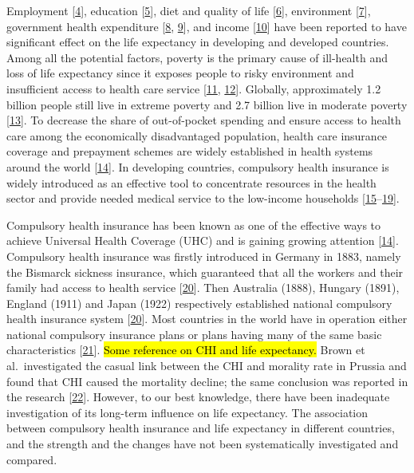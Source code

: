 \documentclass[]{elsarticle} %
\begin{document}
Employment {[}\protect\hyperlink{ref-assari2018life}{4}{]}, education {[}\protect\hyperlink{ref-baker2011education}{5}{]}, diet and quality of life {[}\protect\hyperlink{ref-rehm2018drinking}{6}{]}, environment {[}\protect\hyperlink{ref-schwartz2018estimating}{7}{]}, government health expenditure {[}\protect\hyperlink{ref-jakovljevic2016life}{8}, \protect\hyperlink{ref-ranabhat2018influence}{9}{]}, and income {[}\protect\hyperlink{ref-wilkinson2018impact}{10}{]} have been reported to have significant effect on the life expectancy in developing and developed countries.
Among all the potential factors, poverty is the primary cause of ill-health and loss of life expectancy since it exposes people to risky environment and insufficient access to health care service {[}\protect\hyperlink{ref-world2001dying}{11}, \protect\hyperlink{ref-ezeh2017history}{12}{]}.
Globally, approximately 1.2 billion people still live in extreme poverty and 2.7 billion live in moderate poverty {[}\protect\hyperlink{ref-olinto2013state}{13}{]}.
To decrease the share of out-of-pocket spending and ensure access to health care among the economically disadvantaged population, health care insurance coverage and prepayment schemes are widely established in health systems around the world {[}\protect\hyperlink{ref-wagstaff2018progress}{14}{]}.
In developing countries, compulsory health insurance is widely introduced as an effective tool to concentrate resources in the health sector and provide needed medical service to the low-income households {[}\protect\hyperlink{ref-abel1992health}{15}--\protect\hyperlink{ref-meng2015consolidating}{19}{]}.

Compulsory health insurance has been known as one of the effective ways to achieve Universal Health Coverage (UHC) and is gaining growing attention {[}\protect\hyperlink{ref-wagstaff2018progress}{14}{]}. Compulsory health insurance was firstly introduced in Germany in 1883, namely the Bismarck sickness insurance, which guaranteed that all the workers and their family had access to health service {[}\protect\hyperlink{ref-walker1969compulsory}{20}{]}. Then Australia (1888), Hungary (1891), England (1911) and Japan (1922) respectively established national compulsory health insurance system {[}\protect\hyperlink{ref-walker1969compulsory}{20}{]}. Most countries in the world have in operation either national compulsory insurance plans or plans having many of the same basic characteristics {[}\protect\hyperlink{ref-healthglance2017}{21}{]}. \hl{Some reference on CHI and life expectancy.} Brown et al.~investigated the casual link between the CHI and morality rate in Prussia and found that CHI caused the mortality decline; the same conclusion was reported in the research {[}\protect\hyperlink{ref-bauernschuster2017bismarck}{22}{]}. However, to our best knowledge, there have been inadequate investigation of its long-term influence on life expectancy. The association between compulsory health insurance and life expectancy in different countries, and the strength and the changes have not been systematically investigated and compared.
\end{document}
